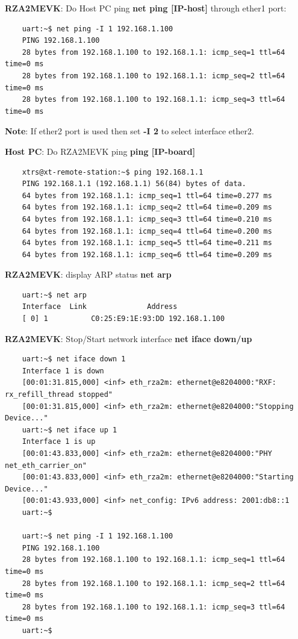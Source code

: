 \documentclass[11pt,a4paper,oneside]{article}
\begin{document}
\textbf{RZA2MEVK}: Do Host PC ping \textbf{net ping [IP-host]} through ether1 port:
\begin{lstlisting}
	uart:~$ net ping -I 1 192.168.1.100
	PING 192.168.1.100
	28 bytes from 192.168.1.100 to 192.168.1.1: icmp_seq=1 ttl=64 time=0 ms
	28 bytes from 192.168.1.100 to 192.168.1.1: icmp_seq=2 ttl=64 time=0 ms
	28 bytes from 192.168.1.100 to 192.168.1.1: icmp_seq=3 ttl=64 time=0 ms
\end{lstlisting}
\textbf{Note}: If ether2 port is used then set \textbf{-I 2} to select interface ether2.

\textbf{Host PC}: Do RZA2MEVK ping \textbf{ping [IP-board]}
\begin{lstlisting}
	xtrs@xt-remote-station:~$ ping 192.168.1.1
	PING 192.168.1.1 (192.168.1.1) 56(84) bytes of data.
	64 bytes from 192.168.1.1: icmp_seq=1 ttl=64 time=0.277 ms
	64 bytes from 192.168.1.1: icmp_seq=2 ttl=64 time=0.209 ms
	64 bytes from 192.168.1.1: icmp_seq=3 ttl=64 time=0.210 ms
	64 bytes from 192.168.1.1: icmp_seq=4 ttl=64 time=0.200 ms
	64 bytes from 192.168.1.1: icmp_seq=5 ttl=64 time=0.211 ms
	64 bytes from 192.168.1.1: icmp_seq=6 ttl=64 time=0.209 ms
\end{lstlisting}

\textbf{RZA2MEVK}: display ARP status \textbf{net arp}
\begin{lstlisting}
	uart:~$ net arp
	Interface  Link              Address
	[ 0] 1          C0:25:E9:1E:93:DD 192.168.1.100
\end{lstlisting}

\textbf{RZA2MEVK}: Stop/Start network interface \textbf{net iface down/up}
\begin{lstlisting}
	uart:~$ net iface down 1
	Interface 1 is down
	[00:01:31.815,000] <inf> eth_rza2m: ethernet@e8204000:"RXF: rx_refill_thread stopped"
	[00:01:31.815,000] <inf> eth_rza2m: ethernet@e8204000:"Stopping Device..."
	uart:~$ net iface up 1
	Interface 1 is up
	[00:01:43.833,000] <inf> eth_rza2m: ethernet@e8204000:"PHY net_eth_carrier_on"
	[00:01:43.833,000] <inf> eth_rza2m: ethernet@e8204000:"Starting Device..."
	[00:01:43.933,000] <inf> net_config: IPv6 address: 2001:db8::1
	uart:~$

	uart:~$ net ping -I 1 192.168.1.100
	PING 192.168.1.100
	28 bytes from 192.168.1.100 to 192.168.1.1: icmp_seq=1 ttl=64 time=0 ms
	28 bytes from 192.168.1.100 to 192.168.1.1: icmp_seq=2 ttl=64 time=0 ms
	28 bytes from 192.168.1.100 to 192.168.1.1: icmp_seq=3 ttl=64 time=0 ms
	uart:~$
\end{lstlisting}
\end{document}
